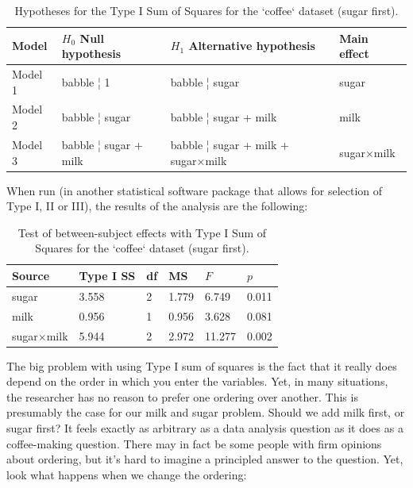 \documentclass[
]{book}
\theoremstyle{definition}
\theoremstyle{definition}
\theoremstyle{definition}
\theoremstyle{definition}
\theoremstyle{remark}
\begin{document}
\begin{table}[!h]

\caption{\label{tab:unnamed-chunk-89}Hypotheses for the Type I Sum of Squares for the `coffee` dataset (sugar first).}
\centering
\begin{tabular}[t]{llll}
\toprule
Model & $H_0$ Null hypothesis & $H_1$ Alternative hypothesis & Main effect\\
\midrule
Model 1 & babble ¦ 1 & babble ¦ sugar & sugar\\
Model 2 & babble ¦ sugar & babble ¦ sugar + milk & milk\\
Model 3 & babble ¦ sugar + milk & babble ¦ sugar + milk + sugar×milk & sugar×milk\\
\bottomrule
\end{tabular}
\end{table}

When run (in another statistical software package that allows for selection of Type I, II or III), the results of the analysis are the following:

\begin{table}[!h]

\caption{\label{tab:unnamed-chunk-90}Test of between-subject effects with Type I Sum of Squares for the `coffee` dataset (sugar first).}
\centering
\begin{tabular}[t]{llllll}
\toprule
Source & Type I SS & df & MS & $F$ & $p$\\
\midrule
sugar & 3.558 & 2 & 1.779 & 6.749 & 0.011\\
milk & 0.956 & 1 & 0.956 & 3.628 & 0.081\\
sugar×milk & 5.944 & 2 & 2.972 & 11.277 & 0.002\\
\bottomrule
\end{tabular}
\end{table}

The big problem with using Type I sum of squares is the fact that it really does depend on the order in which you enter the variables. Yet, in many situations, the researcher has no reason to prefer one ordering over another. This is presumably the case for our milk and sugar problem. Should we add milk first, or sugar first? It feels exactly as arbitrary as a data analysis question as it does as a coffee-making question. There may in fact be some people with firm opinions about ordering, but it's hard to imagine a principled answer to the question. Yet, look what happens when we change the ordering:
\end{document}
